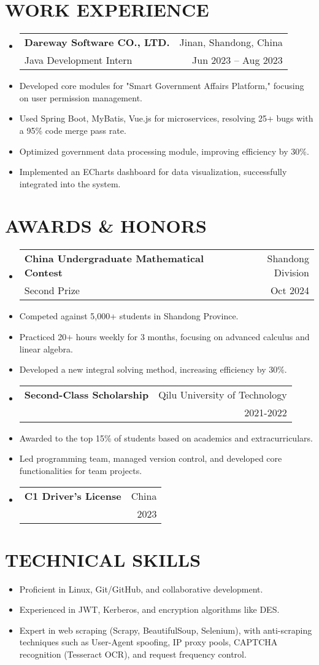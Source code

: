 \documentclass[a4paper,11pt]{article}
\makeatletter
\newenvironment{resumeList}{\begin{itemize}[leftmargin=*,label={}]}{\end{itemize}}
\newcommand{\resumeItem}[1]{\item\small{#1}}
\newcommand{\resumeEntry}[4]{
  \item \begin{tabular*}{0.97\textwidth}{l@{\extracolsep{\fill}}r}
    \textbf{#1} & #2 \\
    #3 & #4 \\
  \end{tabular*}
}
\makeatother
\begin{document}
\section{WORK EXPERIENCE}
\begin{resumeList}
    \resumeEntry{Dareway Software CO., LTD.}
    {Jinan, Shandong, China}
    {Java Development Intern}
    {Jun 2023 -- Aug 2023}

    \resumeItem{Developed core modules for "Smart Government Affairs Platform," focusing on user permission management.}
    \resumeItem{Used Spring Boot, MyBatis, Vue.js for microservices, resolving 25+ bugs with a 95\% code merge pass rate.}
    \resumeItem{Optimized government data processing module, improving efficiency by 30\%.}
    \resumeItem{Implemented an ECharts dashboard for data visualization, successfully integrated into the system.}
\end{resumeList}

\section{AWARDS \& HONORS}
\begin{resumeList}
    \resumeEntry{China Undergraduate Mathematical Contest}
    {Shandong Division}
    {Second Prize}
    {Oct 2024}

    \resumeItem{Competed against 5,000+ students in Shandong Province.}
    \resumeItem{Practiced 20+ hours weekly for 3 months, focusing on advanced calculus and linear algebra.}
    \resumeItem{Developed a new integral solving method, increasing efficiency by 30\%.}
    \pagebreak
    \resumeEntry{Second-Class Scholarship}
    {Qilu University of Technology}
    {}
    {2021-2022}

    \resumeItem{Awarded to the top 15\% of students based on academics and extracurriculars.}
    \resumeItem{Led programming team, managed version control, and developed core functionalities for team projects.}
    \resumeEntry{C1 Driver's License}
{China}
{}
{2023}
\end{resumeList}

\section{TECHNICAL SKILLS}
\begin{resumeList}
    \resumeItem{Proficient in Linux, Git/GitHub, and collaborative development.}
    \resumeItem{Experienced in JWT, Kerberos, and encryption algorithms like DES.}
    \resumeItem{Expert in web scraping (Scrapy, BeautifulSoup, Selenium), with anti-scraping techniques such as User-Agent spoofing, IP proxy pools, CAPTCHA recognition (Tesseract OCR), and request frequency control.}
\end{resumeList}
\end{document}
